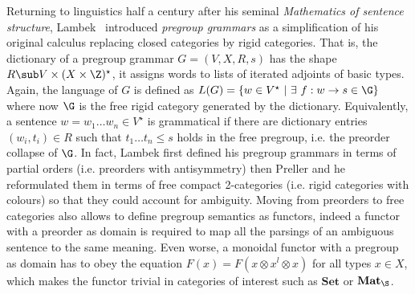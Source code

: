 Returning to linguistics half a century after his seminal \emph{Mathematics of sentence structure}, Lambek~\cite{Lambek99,Lambek01,Lambek08} introduced \emph{pregroup grammars} as a simplification of his original calculus replacing closed categories by rigid categories.
That is, the dictionary of a pregroup grammar $G = (V, X, R, s)$ has the shape $R \sub V \times (X \times \Z)^\star$, it assigns words to lists of iterated adjoints of basic types.
Again, the language of $G$ is defined as $L(G) = \{ w \in V^\star \ \vert \ \exists \ f : w \to s \in \G \}$ where now $\G$ is the free rigid category generated by the dictionary.
Equivalently, a sentence $w = w_1 \dots w_n \in V^\star$ is grammatical if there are dictionary entries $(w_i, t_i) \in R$ such that $t_1 \dots t_n \leq s$ holds in the free pregroup, i.e. the preorder collapse of $\G$.
In fact, Lambek first defined his pregroup grammars in terms of partial orders (i.e. preorders with antisymmetry) then Preller and he~\cite{PrellerLambek07} reformulated them in terms of free compact 2-categories (i.e. rigid categories with colours) so that they could account for ambiguity.
Moving from preorders to free categories also allows to define pregroup semantics as functors, indeed a functor with a preorder as domain is required to map all the parsings of an ambiguous sentence to the same meaning.
Even worse, a monoidal functor with a pregroup as domain has to obey the equation $F(x) = F(x \otimes x^l \otimes x)$ for all types $x \in X$, which makes the functor trivial in categories of interest such as $\mathbf{Set}$ or $\mathbf{Mat}_\S$.

